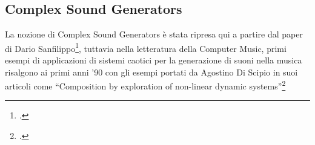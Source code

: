 \subsection{Complex Sound Generators}
\label{Complex Sound Generators}

La nozione di Complex Sound Generators è stata ripresa qui a partire dal
paper di Dario Sanfilippo\footcite{sanfilippo_constrained_2021},
tuttavia nella letteratura della Computer Music, primi esempi di applicazioni
di sistemi caotici per la generazione di suoni nella musica risalgono
ai primi anni '90 con gli esempi portati da Agostino Di Scipio
in suoi articoli come “Composition by exploration of non-linear dynamic systems”\footcite{discipioiterated}

